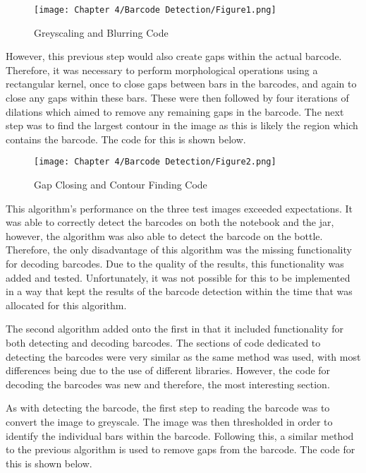 \begin{figure}[H]        
    \centering
    \texttt{[image: Chapter 4/Barcode Detection/Figure1.png]}
    \caption{Greyscaling and Blurring Code}
    \label{fig:bc1}
\end{figure} 

However, this previous step would also create gaps within the actual barcode.
Therefore, it was necessary to perform morphological operations using a rectangular kernel, once to close gaps between bars in the barcodes, and again to close any gaps within these bars.
These were then followed by four iterations of dilations which aimed to remove any remaining gaps in the barcode.
The next step was to find the largest contour in the image as this is likely the region which contains the barcode.
The code for this is shown below.

\begin{figure}[H]        
    \centering
    \texttt{[image: Chapter 4/Barcode Detection/Figure2.png]}
    \caption{Gap Closing and Contour Finding Code}
    \label{fig:bc2}
\end{figure} 

This algorithm's performance on the three test images exceeded expectations.
It was able to correctly detect the barcodes on both the notebook and the jar, however, the algorithm was also able to detect the barcode on the bottle.
Therefore, the only disadvantage of this algorithm was the missing functionality for decoding barcodes.
Due to the quality of the results, this functionality was added and tested.
Unfortunately, it was not possible for this to be implemented in a way that kept the results of the barcode detection within the time that was allocated for this algorithm.

The second algorithm \cite{ryan_zabad_vaughan_2019} added onto the first in that it included functionality for both detecting and decoding barcodes.
The sections of code dedicated to detecting the barcodes were very similar as the same method was used, with most differences being due to the use of different libraries.
However, the code for decoding the barcodes was new and therefore, the most interesting section.

As with detecting the barcode, the first step to reading the barcode was to convert the image to greyscale.
The image was then thresholded in order to identify the individual bars within the barcode.
Following this, a similar method to the previous algorithm is used to remove gaps from the barcode.
The code for this is shown below.

